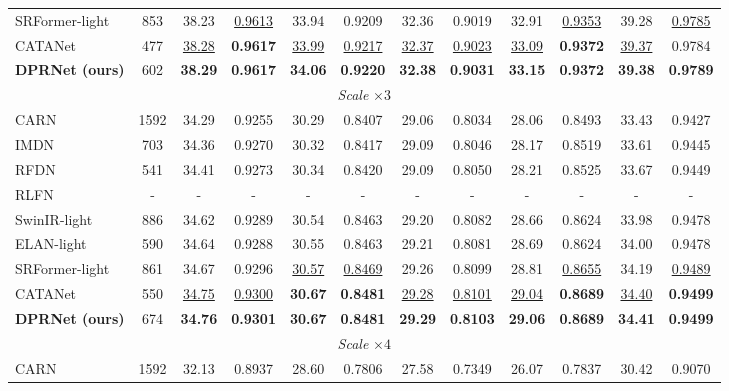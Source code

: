 \begin{table}[t]
\begin{tabular*}{\textwidth}{@{\extracolsep{\fill}}lccccccccccc}
SRFormer-light  & 853  & 38.23 & \underline{0.9613} & 33.94 & 0.9209 & 32.36 & 0.9019 & 32.91 & \underline{0.9353} & 39.28 & \underline{0.9785} \\
CATANet         & 477  & \underline{38.28} & \textbf{0.9617} & \underline{33.99} & \underline{0.9217} & \underline{32.37} & \underline{0.9023} & \underline{33.09} & \textbf{0.9372} & \underline{39.37} & 0.9784 \\
\textbf{DPRNet (ours)} & 602 & \textbf{38.29} & \textbf{0.9617} & \textbf{34.06} & \textbf{0.9220} & \textbf{32.38} & \textbf{0.9031} & \textbf{33.15} & \textbf{0.9372} & \textbf{39.38} & \textbf{0.9789} \\
\midrule
\multicolumn{12}{c}{\textit{Scale} $\times 3$} \\
\midrule
CARN            & 1592 & 34.29 & 0.9255 & 30.29 & 0.8407 & 29.06 & 0.8034 & 28.06 & 0.8493 & 33.43 & 0.9427 \\
IMDN            & 703  & 34.36 & 0.9270 & 30.32 & 0.8417 & 29.09 & 0.8046 & 28.17 & 0.8519 & 33.61 & 0.9445 \\
RFDN            & 541  & 34.41 & 0.9273 & 30.34 & 0.8420 & 29.09 & 0.8050 & 28.21 & 0.8525 & 33.67 & 0.9449 \\
RLFN            & -    & -     & -      & -     & -      & -     & -      & -     & -      & -     & -      \\
SwinIR-light    & 886  & 34.62 & 0.9289 & 30.54 & 0.8463 & 29.20 & 0.8082 & 28.66 & 0.8624 & 33.98 & 0.9478 \\
ELAN-light      & 590  & 34.64 & 0.9288 & 30.55 & 0.8463 & 29.21 & 0.8081 & 28.69 & 0.8624 & 34.00 & 0.9478 \\
SRFormer-light  & 861  & 34.67 & 0.9296 & \underline{30.57} & \underline{0.8469} & 29.26 & 0.8099 & 28.81 & \underline{0.8655} & 34.19 & \underline{0.9489} \\
CATANet         & 550  & \underline{34.75} & \underline{0.9300} & \textbf{30.67} & \textbf{0.8481} & \underline{29.28} & \underline{0.8101} & \underline{29.04} & \textbf{0.8689} & \underline{34.40} & \textbf{0.9499} \\
\textbf{DPRNet (ours)} & 674 & \textbf{34.76} & \textbf{0.9301} & \textbf{30.67} & \textbf{0.8481} & \textbf{29.29} & \textbf{0.8103} & \textbf{29.06} & \textbf{0.8689} & \textbf{34.41} & \textbf{0.9499} \\
\midrule
\multicolumn{12}{c}{\textit{Scale} $\times 4$} \\
\midrule
CARN            & 1592 & 32.13 & 0.8937 & 28.60 & 0.7806 & 27.58 & 0.7349 & 26.07 & 0.7837 & 30.42 & 0.9070 \\

\end{tabular*}
\end{table}
